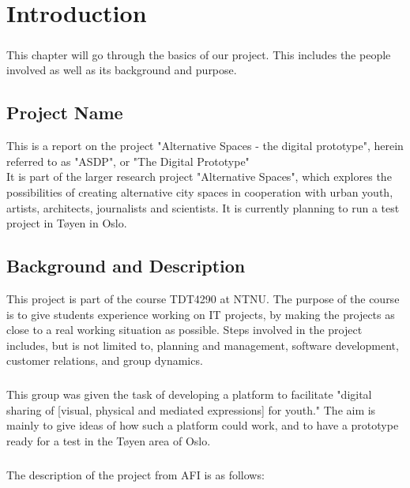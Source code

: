 \chapter{Introduction}

\paragraph{} This chapter will go through the basics of our project. This includes the people involved as well as its background and purpose.

\section{Project Name} 
This is a report on the project "Alternative Spaces - the digital prototype", herein referred to as "ASDP", or "The Digital Prototype"\\
\indent It is part of the larger research project "Alternative Spaces", which explores the possibilities of creating alternative city spaces in cooperation with urban youth, artists, architects, journalists and scientists. It is currently planning to run a test project in T\o yen in Oslo.

\section{Background and Description}
This project is part of the course TDT4290 at NTNU. The purpose of the course is to give students experience working on IT projects, by making the projects as close to a real working situation as possible. Steps involved in the project includes, but is not limited to, planning and management, software development, customer relations, and group dynamics.
\paragraph*{} This group was given the task of developing a platform to facilitate "digital sharing of [visual, physical and mediated expressions] for youth." The aim is mainly to give ideas of how such a platform could work, and to have a prototype ready for a test in the T\o yen area of Oslo.
\paragraph*{} The description of the project from AFI is as follows:
